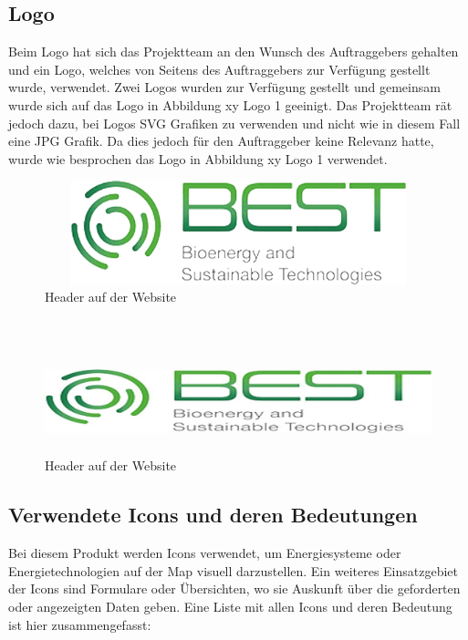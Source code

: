 \subsection{Logo}
Beim Logo hat sich das Projektteam an den Wunsch des Auftraggebers gehalten und ein Logo, welches von Seitens des Auftraggebers zur Verfügung gestellt wurde, verwendet. Zwei Logos wurden zur Verfügung gestellt und gemeinsam wurde sich auf das Logo in Abbildung xy Logo 1 geeinigt. Das Projektteam rät jedoch dazu, bei Logos SVG Grafiken zu verwenden und nicht wie in diesem Fall eine JPG Grafik. Da dies jedoch für den Auftraggeber keine Relevanz hatte, wurde wie besprochen das Logo in Abbildung xy Logo 1 verwendet.
\\
\begin{figure}[h]
	\centering
	\includegraphics[height=3cm,width=14cm]{images/Logo1}
	\caption{Header auf der Website}
	\label{fig: Header}
\end{figure}
\\
\begin{figure}[h]
	\centering
	\includegraphics[height=3cm,width=14cm]{images/Logo2}
	\caption{Header auf der Website}
	\label{fig: Header}
\end{figure}


\subsection{Verwendete Icons und deren Bedeutungen} \label{sec:Verwendete Icons und deren Bedeutungen}
Bei diesem Produkt werden Icons verwendet, um Energiesysteme oder Energietechnologien auf der Map visuell darzustellen. Ein weiteres Einsatzgebiet der Icons sind Formulare oder Übersichten, wo sie Auskunft über die geforderten oder angezeigten Daten geben. Eine Liste mit allen Icons und deren Bedeutung ist hier zusammengefasst:



